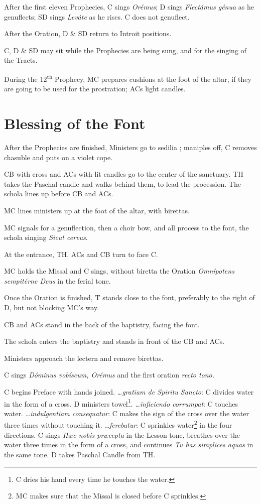 {\rubric After the first eleven Prophecies, C sings \textit{Orémus}; D sings
\textit{Flectámus génua} as he genuflects; SD sings \textit{Leváte} as he
rises. C does not genuflect.

\rubric After the Oration, D \& SD return to Introit positions.

\rubric C, D \& SD may sit while the Prophecies are being sung, and for the
singing of the Tracts.

\rubric During the 12\textsuperscript{th} Prophecy, MC prepares cushions at the
foot of the altar, if they are going to be used for the prostration; ACs light
candles.

\section{Blessing of the Font}

\rubric After the Prophecies are finished, Ministers go to sedilia \pbr;
maniples off, C removes chasuble and puts on a violet cope.

\rubric CB with cross and ACs with lit candles go to the center of the
sanctuary. TH takes the Paschal candle and walks behind them, to lead the
procession. The schola lines up before CB and ACs.

\rubric MC lines ministers up at the foot of the altar, with birettas.

\rubric MC signals for a genuflection, then a choir bow, and all process to the
font, the schola singing \textit{Sicut cervus}.

\rubric At the entrance, TH, ACs and CB turn to face C.

\rubric MC holds the Missal and C sings, without biretta the Oration
\textit{Omnípotens sempitérne Deus} in the ferial tone.

\rubric Once the Oration is finished, T stands close to the font, preferably to
the right of D, but not blocking MC's way.

\rubric CB and ACs stand in the back of the baptistry, facing the font.

\rubric The schola enters the baptistry and stands in front of the CB and ACs.

\rubric Ministers approach the lectern and remove birettas.

\rubric C sings \textit{Dóminus vobíscum, Orémus} and the first oration
\textit{recto tono.}

\rubric C begins Preface with hands joined. \textit{\dots gratiam de Spiritu
Sancto}: C divides water in the form of a cross. D ministers towel\footnote{C
dries his hand every time he touches the water.}. \textit{\dots inficiendo
corrumpat}: C touches water. \textit{\dots indulgentiam consequatur}: C makes
the sign of the cross over the water three times without touching it.
\textit{\dots ferebatur}: C sprinkles water\footnote{MC makes sure that the
Missal is closed before C sprinkles.} in the four directions. C sings
\textit{Hæc nobis præcepta} in the Lesson tone, breathes over the water three
times in the form of a cross, and continues \textit{Tu has simplices aquas} in
the same tone. D takes Paschal Candle from TH.

}
